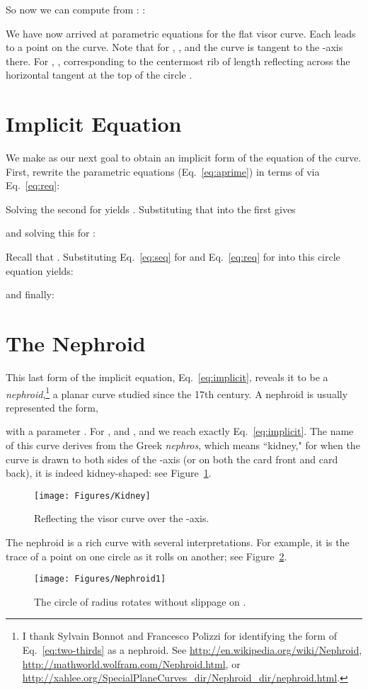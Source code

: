 \pdfoutput=1  \documentclass[]{article}
\newcommand{\figlab}[1]{\label{fig:#1}}
\newcommand{\eqnref}[1]{\ref{eq:#1}}
\newcommand{\figref}[1]{\ref{fig:#1}}
\begin{document}
So now we can compute  from :
: 

We have now arrived at parametric equations for the flat visor curve.
Each  leads to a point  on the curve.
Note that for , , and the curve is
tangent to the -axis there.
For , ,
 corresponding to the centermost rib of length  reflecting across the horizontal
tangent at the top of the circle .

\section{Implicit Equation}
We make as our next goal to obtain an implicit form of the equation of the curve.
First, rewrite the parametric equations (Eq.~\eqnref{aprime}) in terms of  via Eq.~\eqnref{req}: 

Solving the second for  yields .
Substituting that into the first gives

and solving this for :

Recall that . Substituting Eq.~\eqnref{seq} for  and Eq.~\eqnref{req} for  
into this circle equation yields:

and finally:


\section{The Nephroid}
This last form of the implicit equation, Eq.~\eqnref{implicit},
reveals it to be a
\emph{nephroid},\footnote{
I thank Sylvain Bonnot and Francesco Polizzi for identifying 
the form of Eq.~\eqnref{two-thirds} as a nephroid.
See \url{http://en.wikipedia.org/wiki/Nephroid},
\url{http://mathworld.wolfram.com/Nephroid.html}, or
\url{http://xahlee.org/SpecialPlaneCurves_dir/Nephroid_dir/nephroid.html}.
}
a planar curve studied since the 17th century.
A nephroid
is usually represented the form, 

with a parameter .
For ,  and ,
and we reach exactly
Eq.~\eqnref{implicit}.
The name of this curve derives from the Greek
\emph{nephros}, which means ``kidney,"
for when the curve is drawn to both sides of the -axis
(or on both the card front and card back), it is indeed
kidney-shaped:
see Figure~\figref{Kidney}.
\begin{figure}[htbp]
\centering
\texttt{[image: Figures/Kidney]}
\caption{Reflecting the visor curve over the -axis.}
\figlab{Kidney}
\end{figure}


The nephroid is a rich curve with several interpretations.
For example, it is the trace of a point on one circle as it rolls on another;
see Figure~\figref{Nephroid1}.
\begin{figure}[htbp]
\centering
\texttt{[image: Figures/Nephroid1]}
\caption{The circle of radius  rotates without slippage on .}
\figlab{Nephroid1}
\end{figure}
\end{document}
